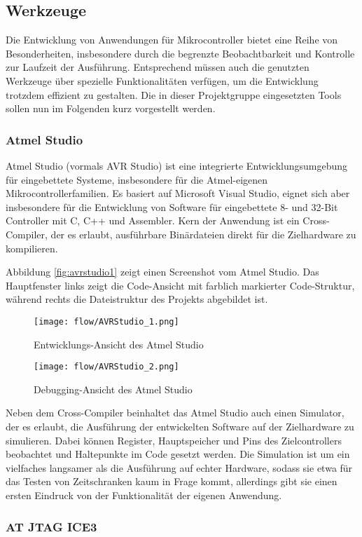 \subsection{Werkzeuge}
Die Entwicklung von Anwendungen für Mikrocontroller bietet eine Reihe von Besonderheiten, insbesondere durch die begrenzte Beobachtbarkeit und Kontrolle zur Laufzeit der Ausführung. Entsprechend müssen auch die genutzten Werkzeuge über spezielle Funktionalitäten verfügen, um die Entwicklung trotzdem effizient zu gestalten. Die in dieser Projektgruppe eingesetzten Tools sollen nun im Folgenden kurz vorgestellt werden.

\subsubsection{Atmel Studio}
Atmel Studio (vormals AVR Studio) ist eine integrierte Entwicklungsumgebung für eingebettete Systeme, insbesondere für die Atmel-eigenen Mikrocontrollerfamilien.
Es basiert auf Microsoft Visual Studio, eignet sich aber insbesondere für die Entwicklung von Software für eingebettete 8- und 32-Bit Controller mit C, C++ und Assembler.
Kern der Anwendung ist ein Cross-Compiler, der es erlaubt, ausführbare Binärdateien direkt für die Zielhardware zu kompilieren.

Abbildung \autoref{fig:avrstudio1} zeigt einen Screenshot vom Atmel Studio. Das Hauptfenster links zeigt die Code-Ansicht mit farblich markierter Code-Struktur, während rechts die Dateistruktur des Projekts abgebildet ist.

\begin{figure}[th]
  \centering
    \texttt{[image: flow/AVRStudio\_1.png]}
    \caption{Entwicklungs-Ansicht des Atmel Studio}
    \label{fig:avrstudio1}
\end{figure}

\begin{figure}[h!]
  \centering
    \texttt{[image: flow/AVRStudio\_2.png]}
    \caption{Debugging-Ansicht des Atmel Studio}
    \label{fig:avrstudio2}
\end{figure}

Neben dem Cross-Compiler beinhaltet das Atmel Studio auch einen Simulator, der es erlaubt, die Ausführung der entwickelten Software auf der Zielhardware zu simulieren. Dabei können Register, Hauptspeicher und Pins des Zielcontrollers beobachtet und Haltepunkte im Code gesetzt werden. Die Simulation ist um ein vielfaches langsamer als die Ausführung auf echter Hardware, sodass sie etwa für das Testen von Zeitschranken kaum in Frage kommt, allerdings gibt sie einen ersten Eindruck von der Funktionalität der eigenen Anwendung.

\subsubsection{AT JTAG ICE3}